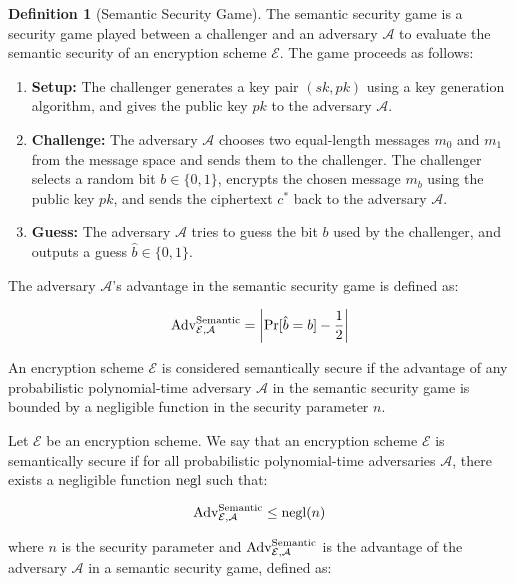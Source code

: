 \documentclass[12pt,openany]{book}
\theoremstyle{definition}
\newtheorem{definition}{Definition}[chapter]
\newcommand{\A}{\mathcal{A}}
\newcommand{\E}{\mathcal{E}}
\newcommand{\Adv}{\textnormal{Adv}}
\newcommand{\negl}{\textnormal{negl}}
\begin{document}
	\begin{definition}[Semantic Security Game]
		The semantic security game is a security game played between a challenger and an adversary $\A$ to evaluate the semantic security of an encryption scheme $\E$. The game proceeds as follows:
		
		\begin{enumerate}
			\item \textbf{Setup:}
			The challenger generates a key pair $(sk, pk)$ using a key generation algorithm, and gives the public key $pk$ to the adversary $\A$.
			
			\item \textbf{Challenge:}
			The adversary $\A$ chooses two equal-length messages $m_0$ and $m_1$ from the message space and sends them to the challenger. The challenger selects a random bit $b \in \{0, 1\}$, encrypts the chosen message $m_b$ using the public key $pk$, and sends the ciphertext $c^*$ back to the adversary $\A$.
			
			\item \textbf{Guess:}
			The adversary $\A$ tries to guess the bit $b$ used by the challenger, and outputs a guess $\hat{b} \in \{0, 1\}$.
		\end{enumerate}
		
		The adversary $\A$'s advantage in the semantic security game is defined as:
		
		\begin{align*}
			\Adv_{\E, \A}^{\text{Semantic}} = \left| \Pr[\hat{b} = b] - \frac{1}{2} \right|
		\end{align*}
		
		An encryption scheme $\E$ is considered semantically secure if the advantage of any probabilistic polynomial-time adversary $\A$ in the semantic security game is bounded by a negligible function in the security parameter $n$.
	\end{definition}
	
	Let $\E$ be an encryption scheme. We say that an encryption scheme $\E$ is semantically secure if for all probabilistic polynomial-time adversaries $\A$, there exists a negligible function $\negl$ such that:
	
	\begin{align*}
		\Adv_{\E, \A}^{\text{Semantic}} \leq \negl(n)
	\end{align*}
	
	where $n$ is the security parameter and $\Adv_{\E, \A}^{\text{Semantic}}$ is the advantage of the adversary $\A$ in a semantic security game, defined as:
	
\end{document}
